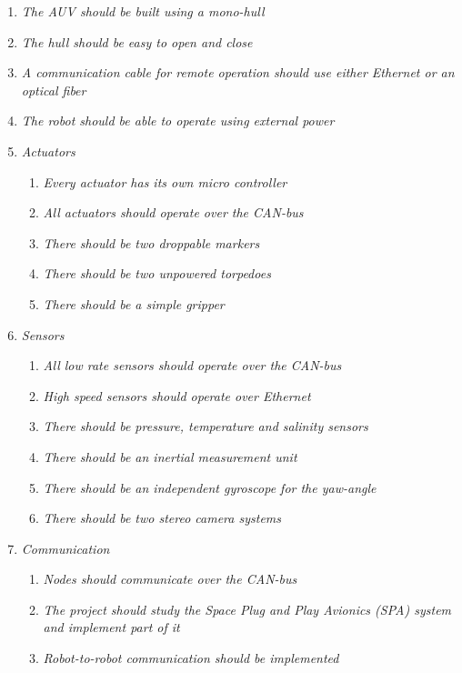 \begin{enumerate}
   \item { \em The AUV should be built using a mono-hull}
   \item { \em The hull should be easy to open and close}
   \item { \em A communication cable for remote operation should use either Ethernet or an optical fiber}
   \item { \em The robot should be able to operate using external power}
   \item { \em Actuators} 
   \begin{enumerate}
   		\item { \em Every actuator has its own micro controller} 
   		\item { \em All actuators should operate over the CAN-bus} 
   		\item { \em There should be two droppable markers} 
   		\item { \em There should be two unpowered torpedoes} 
   		\item { \em There should be a simple gripper} 
   \end{enumerate}
   \item { \em Sensors}
   \begin{enumerate}
   		\item { \em All low rate sensors should operate over the CAN-bus} 
   		\item { \em High speed sensors should operate over Ethernet} 
   		\item { \em There should be pressure, temperature and salinity sensors} 
   		\item { \em There should be an inertial measurement unit} 
   		\item { \em There should be an independent gyroscope for the yaw-angle} 
   		\item { \em There should be two stereo camera systems}  
   \end{enumerate}
   \item { \em Communication} 
   \begin{enumerate}
   		\item { \em Nodes should communicate over the CAN-bus} 
   		\item { \em The project should study the Space Plug and Play Avionics
				(SPA) system and implement part of it} 
		\item { \em Robot-to-robot communication should be implemented} 		
   \end{enumerate}

\end{enumerate}

